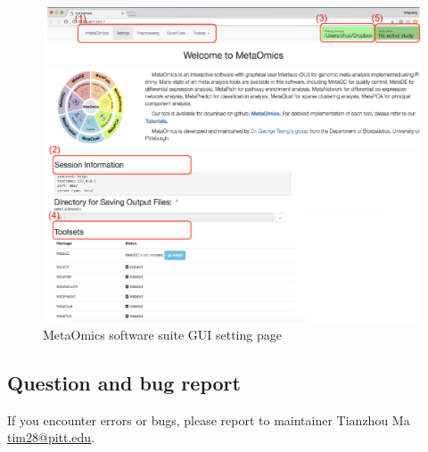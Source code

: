 \begin{figure}[H]
\begin{center}
\includegraphics[scale=1]{./figure/preprocessing/GUIsetting}
\caption{MetaOmics software suite GUI setting page}
\label{fig:GUIsetting}
\end{center}
\end{figure}


\subsection{Question and bug report}

If you encounter errors or bugs, please report to maintainer Tianzhou Ma \url{tim28@pitt.edu}.


 
